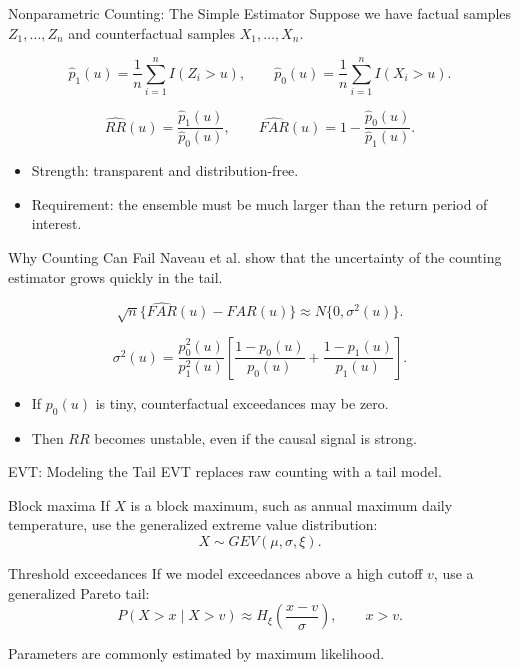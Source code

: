 \documentclass[aspectratio=169]{beamer}
\begin{document}
\begin{frame}{Nonparametric Counting: The Simple Estimator}
  Suppose we have factual samples $Z_1,\ldots,Z_n$ and counterfactual samples
  $X_1,\ldots,X_n$.

  \[
    \hat p_1(u)=\frac{1}{n}\sum_{i=1}^n I(Z_i>u),
    \qquad
    \hat p_0(u)=\frac{1}{n}\sum_{i=1}^n I(X_i>u).
  \]

  \[
    \widehat{RR}(u)=\frac{\hat p_1(u)}{\hat p_0(u)}, \qquad
    \widehat{FAR}(u)=1-\frac{\hat p_0(u)}{\hat p_1(u)}.
  \]

  \begin{itemize}
    \item Strength: transparent and distribution-free.
    \item Requirement: the ensemble must be much larger than the return period of interest.
  \end{itemize}
\end{frame}

\begin{frame}{Why Counting Can Fail}
  Naveau et al. show that the uncertainty of the counting estimator grows quickly in the tail.

  \[
    \sqrt{n}\{\widehat{FAR}(u)-FAR(u)\}
    \approx N\{0,\sigma^2(u)\}.
  \]

  \[
    \sigma^2(u)
    =
    \frac{p_0^2(u)}{p_1^2(u)}
    \left[
      \frac{1-p_0(u)}{p_0(u)}
      +
      \frac{1-p_1(u)}{p_1(u)}
    \right].
  \]

  \begin{itemize}
    \item If $p_0(u)$ is tiny, counterfactual exceedances may be zero.
    \item Then $RR$ becomes unstable, even if the causal signal is strong.
  \end{itemize}
\end{frame}

\begin{frame}{EVT: Modeling the Tail}
  EVT replaces raw counting with a tail model.

  \begin{block}{Block maxima}
    If $X$ is a block maximum, such as annual maximum daily temperature,
    use the generalized extreme value distribution:
    \[
      X \sim GEV(\mu,\sigma,\xi).
    \]
  \end{block}

  \begin{block}{Threshold exceedances}
    If we model exceedances above a high cutoff $v$, use a generalized Pareto tail:
    \[
      P(X>x \mid X>v) \approx H_{\xi}\left(\frac{x-v}{\sigma}\right),
      \qquad x>v.
    \]
  \end{block}

  Parameters are commonly estimated by maximum likelihood.
\end{frame}
\end{document}
